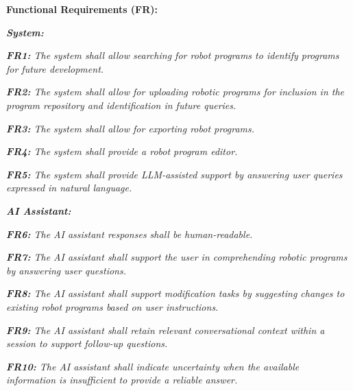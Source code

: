 \textbf{Functional Requirements (FR):}
\begin{adjustwidth}{\indentWidthTwenty}{\indentWidthTwenty}
    \textit{\textbf{System:}}
\end{adjustwidth}
\begin{adjustwidth}{\indentWidthForty}{\indentWidthForty}
    \textit{\textbf{FR1:} The system shall allow searching for robot programs to identify programs for future development.}
\end{adjustwidth}
\begin{adjustwidth}{\indentWidthForty}{\indentWidthForty}
    \textit{\textbf{FR2:} The system shall allow for uploading robotic programs for inclusion in the program repository and identification in future queries.}
\end{adjustwidth}
\begin{adjustwidth}{\indentWidthForty}{\indentWidthForty}
    \textit{\textbf{FR3:} The system shall allow for exporting robot programs.}
\end{adjustwidth}
\begin{adjustwidth}{\indentWidthForty}{\indentWidthForty}
    \textit{\textbf{FR4:} The system shall provide a robot program editor.}
\end{adjustwidth}
\begin{adjustwidth}{\indentWidthForty}{\indentWidthForty}
    \textit{\textbf{FR5:} The system shall provide LLM-assisted support by answering user queries expressed in natural language.}
\end{adjustwidth}

\begin{adjustwidth}{\indentWidthTwenty}{\indentWidthTwenty}
    \textit{\textbf{AI Assistant:}}
\end{adjustwidth}
\begin{adjustwidth}{\indentWidthForty}{\indentWidthForty}
    \textit{\textbf{FR6:} The AI assistant responses shall be human-readable.}
\end{adjustwidth}
\begin{adjustwidth}{\indentWidthForty}{\indentWidthForty}
    \textit{\textbf{FR7:} The AI assistant shall support the user in comprehending robotic programs by answering user questions.}
\end{adjustwidth}
\begin{adjustwidth}{\indentWidthForty}{\indentWidthForty}
    \textit{\textbf{FR8:} The AI assistant shall support modification tasks by suggesting changes to existing robot programs based on user instructions.}
\end{adjustwidth}
\begin{adjustwidth}{\indentWidthForty}{\indentWidthForty}
    \textit{\textbf{FR9:} The AI assistant shall retain relevant conversational context within a session to support follow-up questions.}
\end{adjustwidth}
\begin{adjustwidth}{\indentWidthForty}{\indentWidthForty}
    \textit{\textbf{FR10:} The AI assistant shall indicate uncertainty when the available information is insufficient to provide a reliable answer.}
\end{adjustwidth}


